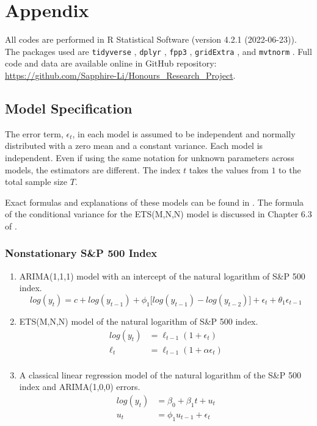 \documentclass{monashthesis}
\begin{document}
\appendix

\hypertarget{appendix}{%
\chapter{Appendix}\label{appendix}}

All codes are performed in R Statistical Software (version 4.2.1 (2022-06-23)). The packages used are \texttt{tidyverse} \autocite{tidy19}, \texttt{dplyr} \autocite{dplyr23}, \texttt{fpp3} \autocite{fpp23}, \texttt{gridExtra} \autocite{gridExtra}, and \texttt{mvtnorm} \autocite{GBMMLSH21}. Full code and data are available online in GitHub repository: \url{https://github.com/Sapphire-Li/Honours_Research_Project}.

\hypertarget{model-specification}{%
\section{Model Specification}\label{model-specification}}

The error term, \(\epsilon_t\), in each model is assumed to be independent and normally distributed with a zero mean and a constant variance. Each model is independent. Even if using the same notation for unknown parameters across models, the estimators are different. The index \(t\) takes the values from \(1\) to the total sample size \(T\).

Exact formulas and explanations of these models can be found in \textcite{fpp3}. The formula of the conditional variance for the ETS(M,N,N) model is discussed in Chapter 6.3 of \textcite{HKOS08}.

\hypertarget{nonstationary-sp-500-index}{%
\subsection{Nonstationary S\&P 500 Index}\label{nonstationary-sp-500-index}}

\begin{enumerate}
\def\labelenumi{\arabic{enumi}.}
\item
  ARIMA(1,1,1) model with an intercept of the natural logarithm of S\&P 500 index.
  \begin{equation*}
  log(y_t) = c + log(y_{t-1}) + \phi_1\big[log(y_{t-1})-log(y_{t-2})\big] + \epsilon_t + \theta_1\epsilon_{t-1}
  \end{equation*}
\item
  ETS(M,N,N) model of the natural logarithm of S\&P 500 index.
  \begin{align*}
  log(y_t) &= \ell_{t-1} (1+\epsilon_t) \\
  \ell_t &= \ell_{t-1} (1+\alpha \epsilon_t) \\
  \end{align*}
\item
  A classical linear regression model of the natural logarithm of the S\&P 500 index and ARIMA(1,0,0) errors.
  \begin{align*}
  log(y_t) &= \beta_0 + \beta_1 t + u_t \\
  u_t &= \phi_1 u_{t-1} + \epsilon_t
  \end{align*}
\end{enumerate}
\end{document}
